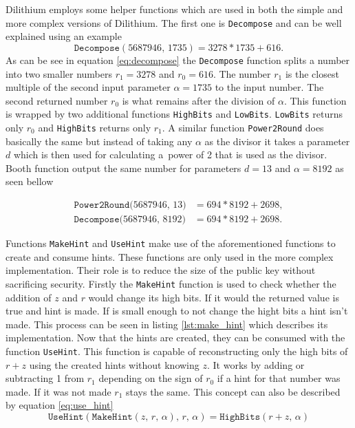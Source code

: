 Dilithium employs some helper functions which are used in both the simple and more complex versions of Dilithium. The first one is \texttt{Decompose} and can be well explained using an example
\begin{equation}
  \label{eq:decompose}
  \mathrm{\texttt{Decompose}}(5687946,\,1735)=3278*1735+616.
\end{equation}
\noindent As can be see in equation \ref{eq:decompose} the \texttt{Decompose} function splits a number into two smaller numbers $r_1=3278$ and $r_0=616$. The number $r_1$ is the closest multiple of the second input parameter $\alpha=1735$ to the input number. The second returned number $r_0$ is what remains after the division of $\alpha$. This function is wrapped by two additional functions \texttt{HighBits} and \texttt{LowBits}. \texttt{LowBits} returns only $r_0$ and \texttt{HighBits} returns only $r_1$. A similar function \texttt{Power2Round} does basically the same but instead of taking any $\alpha$ as the divisor it takes a parameter $d$ which is then used for calculating a~power of 2 that is used as the divisor. Booth function output the same number for parameters $d=13$ and $\alpha=8192$ as seen bellow

\begin{align}
  \mathrm{\texttt{Power2Round}}(5687946,\,13\mathrm) & =694*8192+2698, \\
  \mathrm{\texttt{Decompose}}(5687946,\,8192\mathrm) & =694*8192+2698.
\end{align}

Functions \texttt{MakeHint} and \texttt{UseHint} make use of the aforementioned functions to create and consume hints. These functions are only used in the more complex implementation. Their role is to reduce the size of the public key without sacrificing security. Firstly the \texttt{MakeHint} function is used to check whether the addition of $z$ and $r$ would change its high bits. If it would the returned value is true and hint is made. If is small enough to not change the hight bits a hint isn't made. This process can be seen in listing \ref{lst:make_hint} which describes its implementation.
\newpage
{}
\noindent Now that the hints are created, they can be consumed with the function \texttt{UseHint}. This function is capable of reconstructing only the high bits of $r+z$ using the created hints without knowing $z$. It works by adding or subtracting 1 from $r_1$ depending on the sign of $r_0$ if a hint for that number was made. If it was not made $r_1$ stays the same. This concept can also be described by equation \ref{eq:use_hint}
\begin{equation}
  \label{eq:use_hint}
  \mathrm{\texttt{UseHint}}(\mathrm{\texttt{MakeHint}}(z,\,r,\,\alpha),\,r,\,\alpha)=\mathrm{\texttt{HighBits}}(r+z,\,\alpha)
\end{equation}
